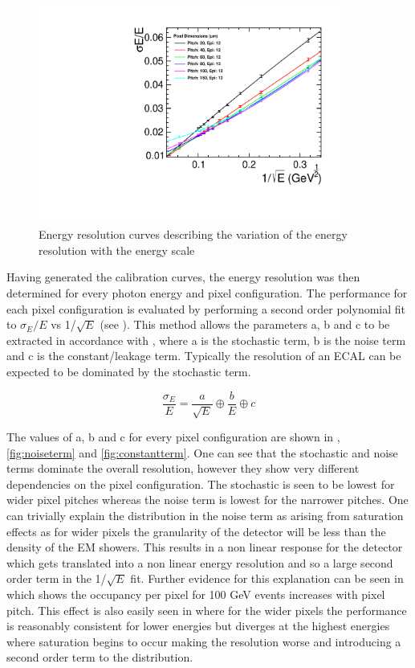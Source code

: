 \begin{figure}
  \centering
  \includegraphics[width=0.9\textwidth,keepaspectratio]{DECALStudies/fig/ResolutionFits.pdf}
  \caption{Energy resolution curves describing the variation of the energy resolution with the energy scale}
  \label{fig:resolutionfits}
\end{figure}

Having generated the calibration curves, the energy resolution was then determined for every photon energy and pixel configuration. The performance for each pixel configuration is evaluated by performing a second order polynomial fit to $\sigma_E/E$ vs 1/$\sqrt{E}$ (see ). This method allows the parameters a, b and c to be extracted in accordance with , where a is the stochastic term, b is the noise term and c is the constant/leakage term. Typically the resolution of an \ac{ECAL} can be expected to be dominated by the stochastic term. 

\begin{equation}
  \label{eq:resolutionformula}
  \frac{\sigma_E}{E}=\frac{a}{\sqrt{E}} \oplus \frac{b}{E} \oplus c
\end{equation}

The values of a, b and c for every pixel configuration are shown in , \ref{fig:noiseterm} and \ref{fig:constantterm}. One can see that the stochastic and noise terms dominate the overall resolution, however they show very different dependencies on the pixel configuration. The stochastic is seen to be lowest for wider pixel pitches whereas the noise term is lowest for the narrower pitches. One can trivially explain the distribution in the noise term as arising from saturation effects as for wider pixels the granularity of the detector will be less than the density of the EM showers. This results in a non linear response for the detector which gets translated into a non linear energy resolution and so a large second order term in the 1/$\sqrt{E}$ fit. Further evidence for this explanation can be seen in  which shows the occupancy per pixel for 100 GeV events increases with pixel pitch. This effect is also easily seen in  where for the wider pixels the performance is reasonably consistent for lower energies but diverges at the highest energies where saturation begins to occur making the resolution worse and introducing a second order term to the distribution.

